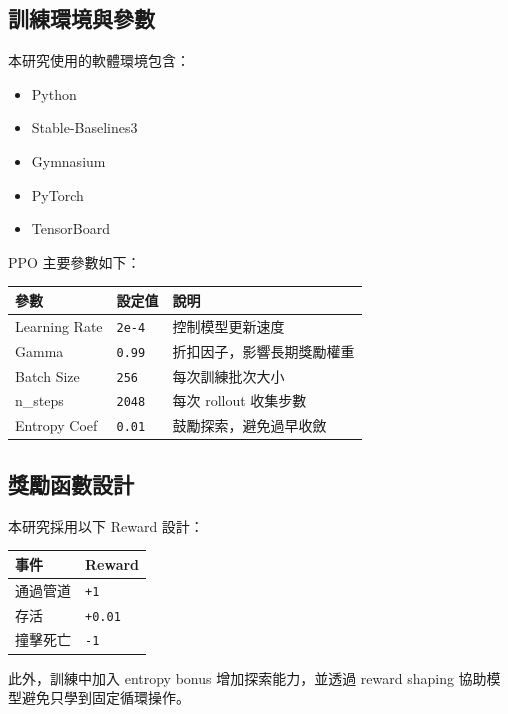 \documentclass[12pt,a4paper]{ctexart}
\begin{document}
\subsection{訓練環境與參數}

本研究使用的軟體環境包含：

\begin{itemize}
  \item Python
  \item Stable-Baselines3
  \item Gymnasium
  \item PyTorch
  \item TensorBoard
\end{itemize}

PPO 主要參數如下：

\begin{table}[h]
\centering
\begin{tabular}{lll}
\toprule
參數 & 設定值 & 說明 \\
\midrule
Learning Rate & \texttt{2e-4} & 控制模型更新速度 \\
Gamma & \texttt{0.99} & 折扣因子，影響長期獎勵權重 \\
Batch Size & \texttt{256} & 每次訓練批次大小 \\
n\_steps & \texttt{2048} & 每次 rollout 收集步數 \\
Entropy Coef & \texttt{0.01} & 鼓勵探索，避免過早收斂 \\
\bottomrule
\end{tabular}
\end{table}

\subsection{獎勵函數設計}

本研究採用以下 Reward 設計：

\begin{table}[h]
\centering
\begin{tabular}{ll}
\toprule
事件 & Reward \\
\midrule
通過管道 & \texttt{+1} \\
存活 & \texttt{+0.01} \\
撞擊死亡 & \texttt{-1} \\
\bottomrule
\end{tabular}
\end{table}

此外，訓練中加入 entropy bonus 增加探索能力，並透過 reward shaping 協助模型避免只學到固定循環操作。
\end{document}

